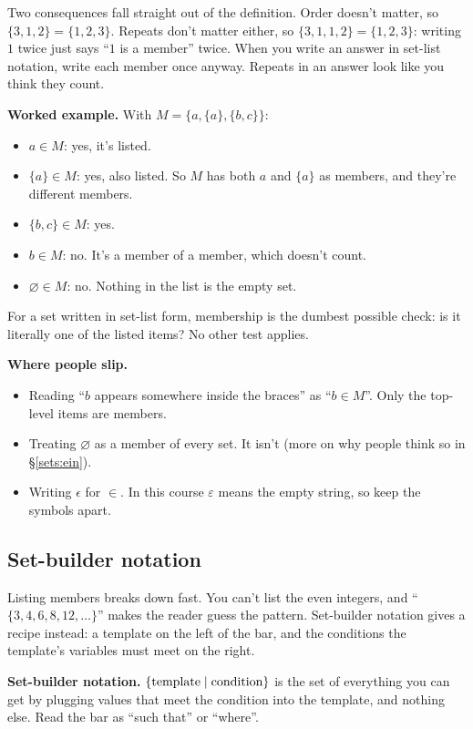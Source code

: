 Two consequences fall straight out of the definition. Order doesn't matter, so $\{3,1,2\}=\{1,2,3\}$. Repeats don't matter either, so $\{3,1,1,2\}=\{1,2,3\}$: writing $1$ twice just says ``$1$ is a member'' twice. When you write an answer in set-list notation, write each member once anyway. Repeats in an answer look like you think they count.

\textbf{Worked example.} With $M=\{a,\{a\},\{b,c\}\}$:
\begin{itemize}
  \item $a\in M$: yes, it's listed.
  \item $\{a\}\in M$: yes, also listed. So $M$ has both $a$ and $\{a\}$ as members, and they're different members.
  \item $\{b,c\}\in M$: yes.
  \item $b\in M$: no. It's a member of a member, which doesn't count.
  \item $\varnothing\in M$: no. Nothing in the list is the empty set.
\end{itemize}
For a set written in set-list form, membership is the dumbest possible check: is it literally one of the listed items? No other test applies.

\textbf{Where people slip.}
\begin{itemize}
  \item Reading ``$b$ appears somewhere inside the braces'' as ``$b\in M$''. Only the top-level items are members.
  \item Treating $\varnothing$ as a member of every set. It isn't (more on why people think so in \S\ref{sets:ein}).
  \item Writing $\epsilon$ for $\in$. In this course $\varepsilon$ means the empty string, so keep the symbols apart.
\end{itemize}

\subsection{Set-builder notation}

Listing members breaks down fast. You can't list the even integers, and ``$\{3,4,6,8,12,\dots\}$'' makes the reader guess the pattern. Set-builder notation gives a recipe instead: a template on the left of the bar, and the conditions the template's variables must meet on the right.

\begin{notebox}
\textbf{Set-builder notation.} $\{\text{template}\mathrel{|}\text{condition}\}$ is the set of everything you can get by plugging values that meet the condition into the template, and nothing else. Read the bar as ``such that'' or ``where''.
\end{notebox}

